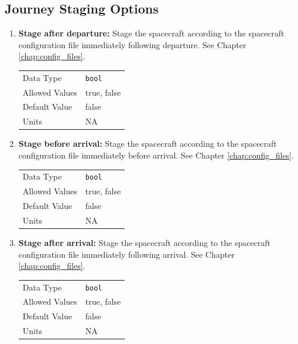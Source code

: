\subsection{Journey Staging Options}

    \begin{enumerate}

        \item \textbf{Stage after departure:} Stage the spacecraft according to the spacecraft configuration file immediately following departure. See Chapter \ref{chap:config_files}.

            \begin{table}[H]
                \hspace{2cm}
                \begin{tabular}{ll}
                Data Type & \verb|bool| \\
                Allowed Values & true, false \\
                Default Value & false \\
                Units & NA
                \end{tabular}
            \end{table}

        \item \textbf{Stage before arrival:} Stage the spacecraft according to the spacecraft configuration file immediately before arrival. See Chapter \ref{chap:config_files}.

            \begin{table}[H]
                \hspace{2cm}
                \begin{tabular}{ll}
                Data Type & \verb|bool| \\
                Allowed Values & true, false \\
                Default Value & false \\
                Units & NA
                \end{tabular}
            \end{table}

        \item \textbf{Stage after arrival:} Stage the spacecraft according to the spacecraft configuration file immediately following arrival. See Chapter \ref{chap:config_files}.

            \begin{table}[H]
                \hspace{2cm}
                \begin{tabular}{ll}
                Data Type & \verb|bool| \\
                Allowed Values & true, false \\
                Default Value & false \\
                Units & NA
                \end{tabular}
            \end{table}

    \end{enumerate}



